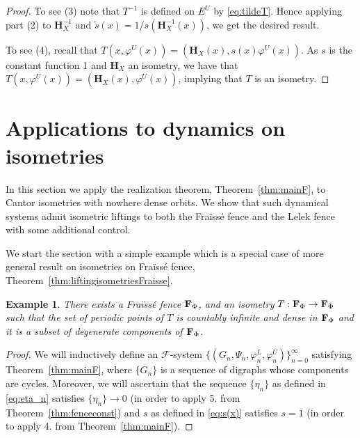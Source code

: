 \documentclass[11pt]{amsart}
\newtheorem{example}[theorem]{Example}
\newcommand{\fence}{{\bf F}_{\Phi}{}}
\newcommand{\homeocantor}{{\mathbf H}_{X}}
\newcommand{\cF}{\mathcal{F}}
\newcommand{\fsystem}{\{(G_n, \Psi_n,\varphi^L_n,\varphi^U_n)\}_{n=0}^{\infty}}
\begin{document}
{\begin{proof}
To see (3) note that $T^{-1}$ is defined on $E^U$ by \eqref{eq:tildeT}. Hence applying part (2) to $\homeocantor^{-1}$ and $\tilde{s}(x)=1/s(\homeocantor^{-1}(x))$, we get the desired result.

To see (4), recall  that $T(x, \varphi^U(x))=(\homeocantor(x),s(x)\varphi^U(x))$. As $s$ is the constant function 1 and $\homeocantor$ an isometry, we have that $T(x, \varphi^U(x))=(\homeocantor(x),\varphi^U(x))$, implying that $T$ is an isometry. 
\end{proof}







\section{Applications to dynamics on isometries}\label{sec: Applications to dynamics on isometries}

In this section we apply the realization theorem, Theorem~\ref{thm:mainF}, to Cantor isometries with nowhere dense orbits. We show that such dynamical systems admit isometric liftings to both the Fraïssé fence and the Lelek fence with some additional control. 



We start the section with a simple example which is a special case of more general result on isometries on Fra\"iss\'e fence, Theorem~\ref{thm:liftingisometriesFraisse}.

\begin{example}\label{ex:warmupisometryfraisse}
    There exists a Fra\"iss\'e fence $\fence$, and an isometry $T:\fence\to \fence$ such that the set of periodic points of $T$ is countably infinite and dense in $\fence$ and it is a subset of degenerate components of $\fence$.
\end{example}

\begin{proof}
    We will inductively define an {$\cF$-system} $\fsystem$ satisfying Theorem~\ref{thm:mainF}, where $\{G_n\}$ is a sequence of digraphs whose components are cycles. Moreover, we will ascertain that the sequence $\{\eta_n\}$ as defined in \eqref{eq:eta_n} satisfies $\{\eta_n\} \rightarrow 0$ (in order to apply 5. from  Theorem~\ref{thm:fenceconst}) and $s$ as defined in \eqref{eq:s(x)} satisfies $s=1$ (in order to apply 4. from Theorem~\ref{thm:mainF}).


\end{proof}}
\end{document}
